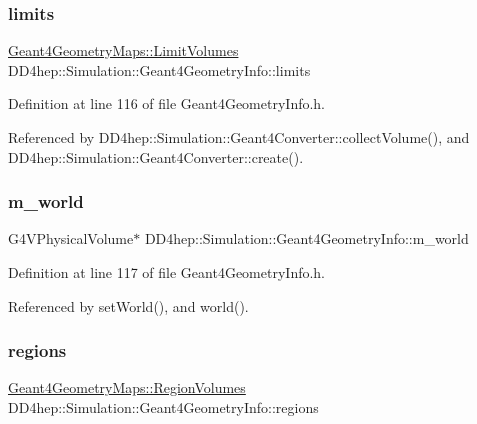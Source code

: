 \subsubsection{\texorpdfstring{limits}{limits}}
{\footnotesize\ttfamily \hyperlink{namespace_d_d4hep_1_1_simulation_1_1_geant4_geometry_maps_a3b9008449a71468a115373b9819457df}{Geant4\+Geometry\+Maps\+::\+Limit\+Volumes} D\+D4hep\+::\+Simulation\+::\+Geant4\+Geometry\+Info\+::limits}



Definition at line 116 of file Geant4\+Geometry\+Info.\+h.



Referenced by D\+D4hep\+::\+Simulation\+::\+Geant4\+Converter\+::collect\+Volume(), and D\+D4hep\+::\+Simulation\+::\+Geant4\+Converter\+::create().

\hypertarget{class_d_d4hep_1_1_simulation_1_1_geant4_geometry_info_afac417dc2da0efb0dafa60863a56856f}{}\label{class_d_d4hep_1_1_simulation_1_1_geant4_geometry_info_afac417dc2da0efb0dafa60863a56856f} 
\subsubsection{\texorpdfstring{m\+\_\+world}{m\_world}}
{\footnotesize\ttfamily G4\+V\+Physical\+Volume$\ast$ D\+D4hep\+::\+Simulation\+::\+Geant4\+Geometry\+Info\+::m\+\_\+world}



Definition at line 117 of file Geant4\+Geometry\+Info.\+h.



Referenced by set\+World(), and world().

\hypertarget{class_d_d4hep_1_1_simulation_1_1_geant4_geometry_info_ad224a954b07a8662bb57f3ee0355cdfa}{}\label{class_d_d4hep_1_1_simulation_1_1_geant4_geometry_info_ad224a954b07a8662bb57f3ee0355cdfa} 
\subsubsection{\texorpdfstring{regions}{regions}}
{\footnotesize\ttfamily \hyperlink{namespace_d_d4hep_1_1_simulation_1_1_geant4_geometry_maps_a9fc457ad93d6235197e7e1ab013d1f56}{Geant4\+Geometry\+Maps\+::\+Region\+Volumes} D\+D4hep\+::\+Simulation\+::\+Geant4\+Geometry\+Info\+::regions}



